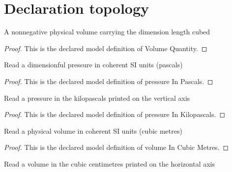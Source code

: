 \section{Declaration topology}
\begin{definition}
  \label{def:physics:phyx-mini-0420:phyxminiproblems-problemphyxmini0420-volumequantity}
  A nonnegative physical volume carrying the dimension length cubed
\end{definition}
\begin{proof}
  This is the declared model definition of Volume Quantity.
\end{proof}
\begin{definition}
  \label{def:physics:phyx-mini-0420:phyxminiproblems-problemphyxmini0420-pressureinpascals}
  Read a dimensionful pressure in coherent SI units (pascals)
\end{definition}
\begin{proof}
  This is the declared model definition of pressure In Pascals.
\end{proof}
\begin{definition}
  \label{def:physics:phyx-mini-0420:phyxminiproblems-problemphyxmini0420-pressureinkilopascals}
  Read a pressure in the kilopascals printed on the vertical axis
\end{definition}
\begin{proof}
  This is the declared model definition of pressure In Kilopascals.
\end{proof}
\begin{definition}
  \label{def:physics:phyx-mini-0420:phyxminiproblems-problemphyxmini0420-volumeincubicmetres}
  Read a physical volume in coherent SI units (cubic metres)
\end{definition}
\begin{proof}
  This is the declared model definition of volume In Cubic Metres.
\end{proof}
\begin{definition}
  \label{def:physics:phyx-mini-0420:phyxminiproblems-problemphyxmini0420-volumeincubiccentimetres}
  Read a volume in the cubic centimetres printed on the horizontal axis
\end{definition}
